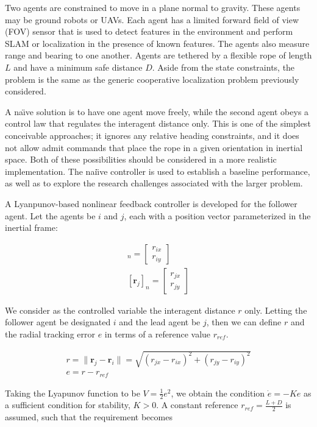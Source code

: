 \documentclass{aiaa-tc}
\newcommand{\br}[2]{[#1]_{#2}} %
\newcommand{\B}[1]{\textbf{#1}} %
\begin{document}
Two agents are constrained to move in a plane normal to gravity. These agents may be ground robots or UAVs. Each agent has a limited forward field of view (FOV) sensor that is used to detect features in the environment and perform SLAM or localization in the presence of known features. The agents also measure range and bearing to one another. Agents are tethered by a flexible rope of length $L$ and have a minimum safe distance $D$. Aside from the state constraints, the problem is the same as the generic cooperative localization problem previously considered.

A na\"{\i}ve solution is to have one agent move freely, while the second agent obeys a control law that regulates the interagent distance only. This is one of the simplest conceivable approaches; it ignores any relative heading constraints, and it does not allow admit commands that place the rope in a given orientation in inertial space. Both of these possibilities should be considered in a more realistic implementation. The nai\"{\i}ve controller is used to establish a baseline performance, as well as to explore the research challenges associated with the larger problem.

A Lyanpunov-based nonlinear feedback controller is developed for the follower agent. Let the agents be $i$ and $j$, each with a position vector parameterized in the inertial frame:

\begin{align}
\br{\B{r}_i}{n} = \begin{bmatrix}
r_{ix}\\
r_{iy}
\end{bmatrix}\\
\br{\B{r}_j}{n} = \begin{bmatrix}
r_{jx}\\
r_{jy}
\end{bmatrix}
\end{align}

We consider as the controlled variable the interagent distance $r$ only. Letting the follower agent be designated $i$ and the lead agent be $j$, then we can define $r$ and the radial tracking error $e$ in terms of a reference value $r_{ref}$.

\begin{align}
r = \| \B{r}_j - \B{r}_i \| = \sqrt{ (r_{jx}-r_{ix})^2 + (r_{jy}-r_{iy})^2} \label{eq:rdef} \\
e = r - r_{ref}
\end{align}

Taking the Lyapunov function to be $V = \frac{1}{2} e^2$, we obtain the condition $\dot{e} = -Ke$ as a sufficient condition for stability, $K > 0$. A constant reference $r_{ref} = \frac{L+D}{2}$ is assumed, such that the requirement becomes
\end{document}
